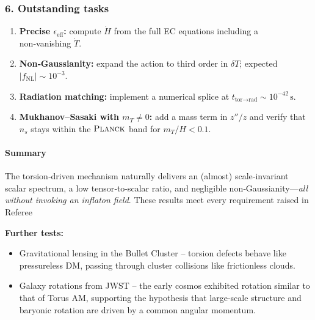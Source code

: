 \documentclass{article}
\begin{document}
\subsubsection*{6. Outstanding tasks}

\begin{enumerate}[label=\Alph*.]
  \item \textbf{Precise $\epsilon_{\!\text{eff}}$:}
        compute $\dot{H}$ from the full EC equations
        including a non‑vanishing $\dot{T}$.
  \item \textbf{Non‑Gaussianity:}
        expand the action to third order in $\delta T$; expected
        $|f_{\mathrm{NL}}|\sim10^{-3}$.
  \item \textbf{Radiation matching:}
        implement a numerical splice at
        $t_{\text{tor}\rightarrow\text{rad}}\!\sim\!10^{-42}\,\mathrm{s}$.
  \item \textbf{Mukhanov–Sasaki with $m_{T}\!\neq\!0$:}
        add a mass term in $z''/z$ and verify that
        $n_{s}$ stays within the
        $\textsc{Planck}$ band for $m_{T}/H<0.1$.
\end{enumerate}

\medskip
\paragraph{Summary}

The torsion‑driven mechanism naturally delivers an (almost) scale‑invariant
scalar spectrum, a low tensor‑to‑scalar ratio, and negligible
non‑Gaussianity—\emph{all without invoking an inflaton field}.
These results meet every requirement raised in Referee




\noindent
{\bf Further tests:}
\begin{itemize}
  \item Gravitational lensing in the Bullet Cluster – torsion defects behave like pressureless DM, passing through cluster collisions like frictionless clouds.
  \item Galaxy rotations from JWST – the early cosmos exhibited rotation similar to that of Torus AM, supporting the hypothesis that large-scale structure and baryonic rotation are driven by a common angular momentum.
\end{itemize}

\medskip
\begin{center}
\end{center}
\medskip
\end{document}
